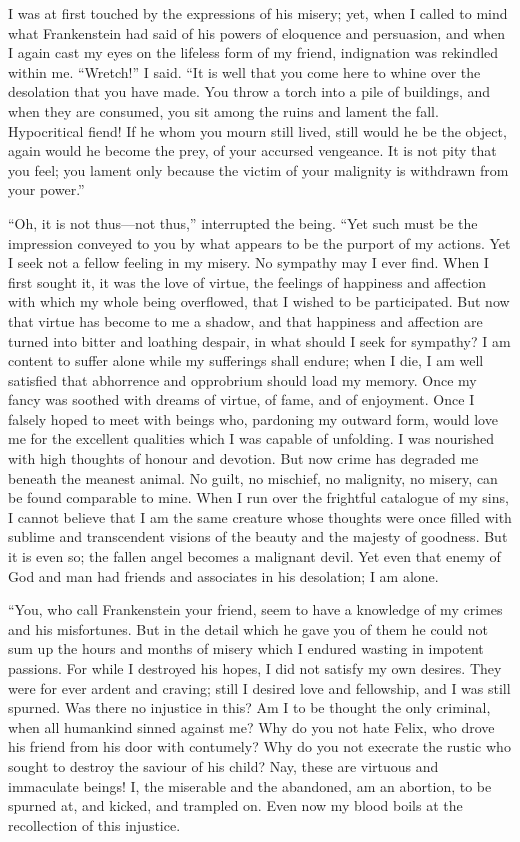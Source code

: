 \documentclass[12pt,openright]{book}
\begin{document}
I was at first touched by the expressions of his misery; yet, when I called to mind what Frankenstein had said of his powers of eloquence and persuasion, and when I again cast my eyes on the lifeless form of my friend, indignation was rekindled within me. “Wretch!” I said. “It is well that you come here to whine over the desolation that you have made. You throw a torch into a pile of buildings, and when they are consumed, you sit among the ruins and lament the fall. Hypocritical fiend! If he whom you mourn still lived, still would he be the object, again would he become the prey, of your accursed vengeance. It is not pity that you feel; you lament only because the victim of your malignity is withdrawn from your power.”

“Oh, it is not thus—not thus,” interrupted the being. “Yet such must be the impression conveyed to you by what appears to be the purport of my actions. Yet I seek not a fellow feeling in my misery. No sympathy may I ever find. When I first sought it, it was the love of virtue, the feelings of happiness and affection with which my whole being overflowed, that I wished to be participated. But now that virtue has become to me a shadow, and that happiness and affection are turned into bitter and loathing despair, in what should I seek for sympathy? I am content to suffer alone while my sufferings shall endure; when I die, I am well satisfied that abhorrence and opprobrium should load my memory. Once my fancy was soothed with dreams of virtue, of fame, and of enjoyment. Once I falsely hoped to meet with beings who, pardoning my outward form, would love me for the excellent qualities which I was capable of unfolding. I was nourished with high thoughts of honour and devotion. But now crime has degraded me beneath the meanest animal. No guilt, no mischief, no malignity, no misery, can be found comparable to mine. When I run over the frightful catalogue of my sins, I cannot believe that I am the same creature whose thoughts were once filled with sublime and transcendent visions of the beauty and the majesty of goodness. But it is even so; the fallen angel becomes a malignant devil. Yet even that enemy of God and man had friends and associates in his desolation; I am alone.

“You, who call Frankenstein your friend, seem to have a knowledge of my crimes and his misfortunes. But in the detail which he gave you of them he could not sum up the hours and months of misery which I endured wasting in impotent passions. For while I destroyed his hopes, I did not satisfy my own desires. They were for ever ardent and craving; still I desired love and fellowship, and I was still spurned. Was there no injustice in this? Am I to be thought the only criminal, when all humankind sinned against me? Why do you not hate Felix, who drove his friend from his door with contumely? Why do you not execrate the rustic who sought to destroy the saviour of his child? Nay, these are virtuous and immaculate beings! I, the miserable and the abandoned, am an abortion, to be spurned at, and kicked, and trampled on. Even now my blood boils at the recollection of this injustice.
\end{document}
